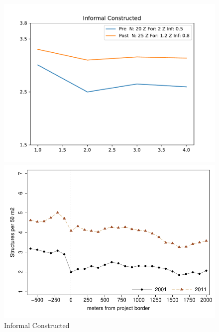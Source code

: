 \documentclass[12pt]{article}
\begin{document}
\begin{figure}[b]
\caption{Informal Constructed}\label{fig4}
\centering
\begin{minipage}[b]{.4\textwidth}
\centering
\includegraphics[scale=.48]{figures/constructed_informal.pdf}
\end{minipage}
\begin{minipage}[b]{.4\textwidth}
\centering
\includegraphics[scale=.5]{figures/bblu_inf_rdp_admin.pdf}
\end{minipage}
\end{figure}


\pagebreak
\end{document}
